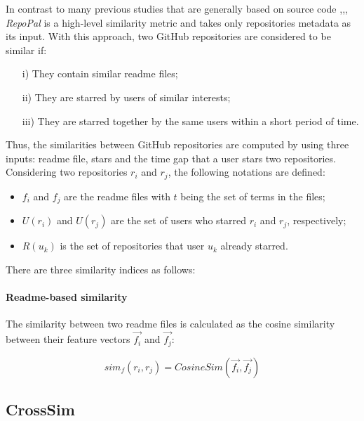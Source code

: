 In contrast to many previous studies that are generally based on source code \cite{10.1109/APSEC.2004.69},\cite{Liu:2006:GDS:1150402.1150522},\cite{McMillan:2012:DSS:2337223.2337267}, \textit{RepoPal}  \cite{10.1109/SANER.2017.7884605} is a high-level similarity metric and takes only repositories metadata as its input. With this approach, two GitHub repositories are considered to be similar if:

\begin{itemize}
	\item[i)] They contain similar readme files;
	\item[ii)] They are starred by users of similar interests;
	\item[iii)] They are starred together by the same users within a short period of time. 
\end{itemize}

Thus, the similarities between GitHub repositories are computed by using three inputs: readme file, stars and the time gap that a user stars two repositories. Considering two repositories $ r_{i} $ and $ r_{j} $, the following notations are defined: 

\begin{itemize}
	\item $ f_{i} $ and $ f_{j} $ are the readme files with $ t $ being the set of terms in the files; 
	\item $ U(r_{i}) $ and $ U(r_{j}) $ are the set of users who starred $ r_{i} $ and $ r_{j} $, respectively; 
	\item $ R(u_{k}) $ is the set of repositories that user $ u_{k} $ already starred.  
\end{itemize}

There are three similarity indices as follows:

\paragraph{Readme-based similarity} 

The similarity between two readme files is calculated as the cosine similarity between their feature vectors $\vec{f_{i}}$ and $\vec{f_{j}}$: 

\begin{equation}
sim_{f}(r_{i},r_{j})=CosineSim(\vec{f_{i}},\vec{f_{j}})
\end{equation}
\clearpage

\subsection{CrossSim}

